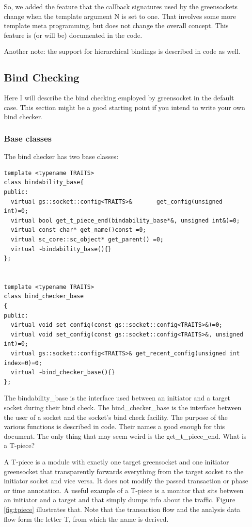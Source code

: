 \documentclass[a4paper,10pt]{article}          %
\newcommand{\code}[1]{{\ttfamily#1}}
\begin{document}
So, we added the feature that the callback signatures used by the greensockets change when the template argument \code{N} is set to one. That involves some more template meta programming, but does not change the overall concept. This feature is (or will be) documented in the code.

Another note: the support for hierarchical bindings is described in code as well.

\subsection{Bind Checking}

Here I will describe the bind checking employed by greensocket in the default case. This section might be a good starting point if you intend to write your own bind checker.

\subsubsection{Base classes}

The bind checker has two base classes:

\begin{lstlisting}
template <typename TRAITS>
class bindability_base{
public:
  virtual gs::socket::config<TRAITS>&       get_config(unsigned int)=0;
  virtual bool get_t_piece_end(bindability_base*&, unsigned int&)=0;
  virtual const char* get_name()const =0;
  virtual sc_core::sc_object* get_parent() =0;
  virtual ~bindability_base(){}
};


template <typename TRAITS>
class bind_checker_base
{
public:
  virtual void set_config(const gs::socket::config<TRAITS>&)=0;
  virtual void set_config(const gs::socket::config<TRAITS>&, unsigned int)=0;
  virtual gs::socket::config<TRAITS>& get_recent_config(unsigned int index=0)=0;
  virtual ~bind_checker_base(){}
};
\end{lstlisting}

The \code{bindability\_base} is the interface used between an initiator and a target socket during their bind check. The \code{bind\_checker\_base} is the interface between the user of a socket and the socket's bind check facility. The purpose of the various functions is described in code. Their names a good enough for this document. The only thing that may seem weird is the \code{get\_t\_piece\_end}. What is a T-piece? 

A T-piece is a module with exactly one target greensocket and one initiator greensocket that transparently forwards everything from the target socket to the initiator socket and vice versa. It does not modify the passed transaction or phase or time annotation. A useful example of a T-piece is a monitor that sits between an initiator and a target and that simply dumps info about the traffic. Figure \ref{fig:tpiece} illustrates that. Note that the transaction flow and the analysis data flow form the letter T, from which the name is derived.
\end{document}
